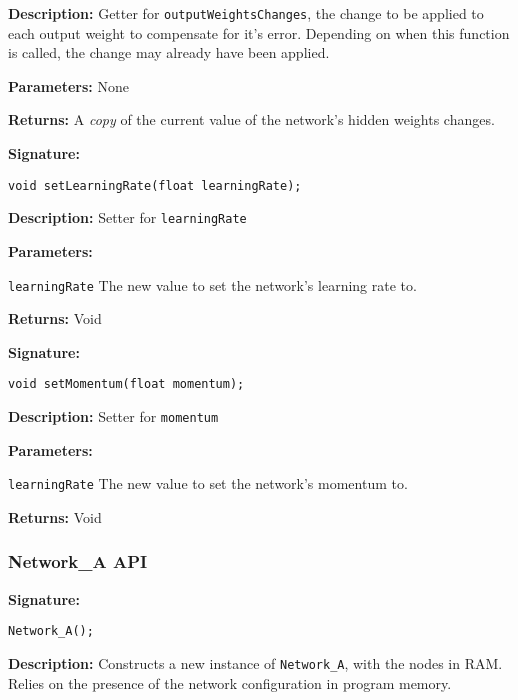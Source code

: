 \documentclass[a4paper]{article}
\begin{document}
\textbf{Description: }
Getter for \lstinline{outputWeightsChanges}, the change to be applied to each output weight to compensate for it's error. Depending on when this function is called, the change may already have been applied.

\textbf{Parameters: } None

\textbf{Returns: }
A \textit{copy} of the current value of the network's hidden weights changes.

\hrulefill %

\textbf{Signature:} \begin{lstlisting}
void setLearningRate(float learningRate);
\end{lstlisting}

\textbf{Description: }
Setter for \lstinline{learningRate}

\textbf{Parameters: }

\lstinline{learningRate} The new value to set the network's learning rate to.

\textbf{Returns: } Void

\hrulefill %

\textbf{Signature:} \begin{lstlisting}
void setMomentum(float momentum);
\end{lstlisting}

\textbf{Description: }
Setter for \lstinline{momentum}

\textbf{Parameters: }

\lstinline{learningRate} The new value to set the network's momentum to.

\textbf{Returns: } Void

\hrulefill %

\subsubsection{Network\_A API}%

\hrulefill %

\textbf{Signature:} \begin{lstlisting}
Network_A();
\end{lstlisting}

\textbf{Description: }
Constructs a new instance of \lstinline{Network_A}, with the nodes in RAM. Relies on the presence of the network configuration in program memory.
\end{document}
